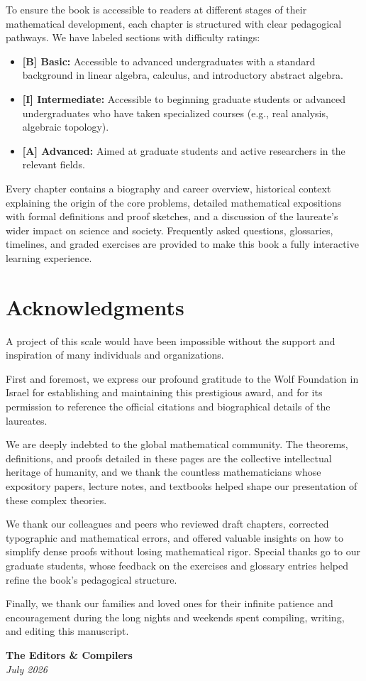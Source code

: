 To ensure the book is accessible to readers at different stages of their mathematical development, each chapter is structured with clear pedagogical pathways. We have labeled sections with difficulty ratings:
\begin{itemize}
    \item \textbf{[B] Basic:} Accessible to advanced undergraduates with a standard background in linear algebra, calculus, and introductory abstract algebra.
    \item \textbf{[I] Intermediate:} Accessible to beginning graduate students or advanced undergraduates who have taken specialized courses (e.g., real analysis, algebraic topology).
    \item \textbf{[A] Advanced:} Aimed at graduate students and active researchers in the relevant fields.
\end{itemize}

Every chapter contains a biography and career overview, historical context explaining the origin of the core problems, detailed mathematical expositions with formal definitions and proof sketches, and a discussion of the laureate's wider impact on science and society. Frequently asked questions, glossaries, timelines, and graded exercises are provided to make this book a fully interactive learning experience.

\section*{Acknowledgments}

A project of this scale would have been impossible without the support and inspiration of many individuals and organizations. 

First and foremost, we express our profound gratitude to the Wolf Foundation in Israel for establishing and maintaining this prestigious award, and for its permission to reference the official citations and biographical details of the laureates.

We are deeply indebted to the global mathematical community. The theorems, definitions, and proofs detailed in these pages are the collective intellectual heritage of humanity, and we thank the countless mathematicians whose expository papers, lecture notes, and textbooks helped shape our presentation of these complex theories. 

We thank our colleagues and peers who reviewed draft chapters, corrected typographic and mathematical errors, and offered valuable insights on how to simplify dense proofs without losing mathematical rigor. Special thanks go to our graduate students, whose feedback on the exercises and glossary entries helped refine the book's pedagogical structure.

Finally, we thank our families and loved ones for their infinite patience and encouragement during the long nights and weekends spent compiling, writing, and editing this manuscript. 

\vspace{1.5cm}

\noindent \textbf{The Editors \& Compilers} \\
\textit{July 2026}
